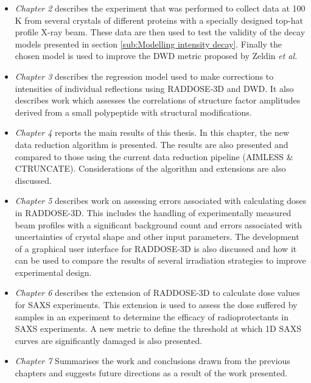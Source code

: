 	\begin{itemize}
        \item \textit{Chapter 2} describes the experiment that was performed to collect data at 100\,K from several crystals of different proteins with a specially designed top-hat profile X-ray beam.
		These data are then used to test the validity of the decay models presented in section \ref{sub:Modelling intensity decay}.
		Finally the chosen model is used to improve the DWD metric proposed by Zeldin \textit{et al.}
		\item \textit{Chapter 3} describes the regression model used to make corrections to intensities of individual reflections using RADDOSE-3D and DWD.
		It also describes work which assesses the correlations of structure factor amplitudes derived from a small polypeptide with structural modifications.
		\item \textit{Chapter 4} reports the main results of this thesis. In this chapter, the new data reduction algorithm is presented.
		The results are also presented and compared to those using the current data reduction pipeline (AIMLESS \& CTRUNCATE).
		Considerations of the algorithm and extensions are also discussed.
		\item \textit{Chapter 5} describes work on assessing errors associated with calculating doses in RADDOSE-3D.
		This includes the handling of experimentally measured beam profiles with a significant background count and errors associated with uncertainties of crystal shape and other input parameters.
		The development of a graphical user interface for RADDOSE-3D is also discussed and how it can be used to compare the results of several irradiation strategies to improve experimental design.
		\item \textit{Chapter 6} describes the extension of RADDOSE-3D to calculate dose values for SAXS experiments.
		This extension is used to assess the dose suffered by samples in an experiment to determine the efficacy of radioprotectants in SAXS experiments.
		A new metric to define the threshold at which 1D SAXS curves are significantly damaged is also presented.
		\item \textit{Chapter 7} Summarises the work and conclusions drawn from the previous chapters and suggests future directions as a result of the work presented.
    \end{itemize}
